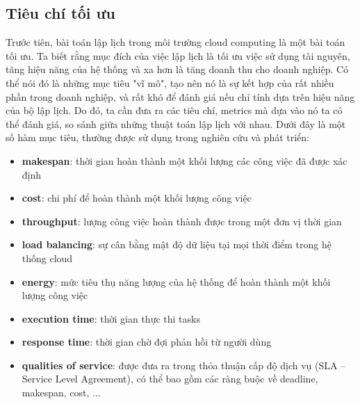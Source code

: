 \documentclass{my_style}
\begin{document}
\subsection*{Tiêu chí tối ưu}
Trước tiên, bài toán lập lịch trong môi trường cloud computing là một bài toán tối ưu.
Ta biết rằng mục đích của việc lập lịch là tối ưu việc sử dụng tài nguyên, tăng hiệu năng của hệ thống và xa hơn là tăng doanh thu cho doanh nghiệp. Có thể nói đó là những mục tiêu "vĩ mô", tạo nên nó là sự kết hợp của rất nhiều phần trong doanh nghiệp, và rất khó để đánh giá nếu chỉ tính dựa trên hiệu năng của bộ lập lịch. 
Do đó, ta cần đưa ra các tiêu chí, metrics mà dựa vào nó ta có thể đánh giá, so sánh giữa những thuật toán lập lịch với nhau. Dưới đây là một số hàm mục tiêu\cite{8}, thường được sử dụng trong nghiên cứu và phát triển: 
\begin{itemize}
	\item \textbf{makespan}: thời gian hoàn thành một khối lượng các công việc đã được xác định
	\item \textbf{cost}: chi phí để hoàn thành một khối lượng công việc 
	\item \textbf{throughput}: lượng công việc hoàn thành được trong một đơn vị thời gian 
	\item \textbf{load balancing}: sự cân bằng mật độ dữ liệu tại mọi thời điểm trong hệ thống cloud 
	\item \textbf{energy}: mức tiêu thụ năng lượng của hệ thống để hoàn thành một khối lượng công việc
	\item \textbf{execution time}: thời gian thực thi tasks
	\item \textbf{response time}: thời gian chờ đợi phản hồi từ người dùng
	\item \textbf{qualities of service}: được đưa ra trong thỏa thuận cấp độ dịch vụ (SLA – Service Level Agreement), có thể bao gồm các ràng buộc về deadline, makespan, cost, ...
\end{itemize}
\end{document}
